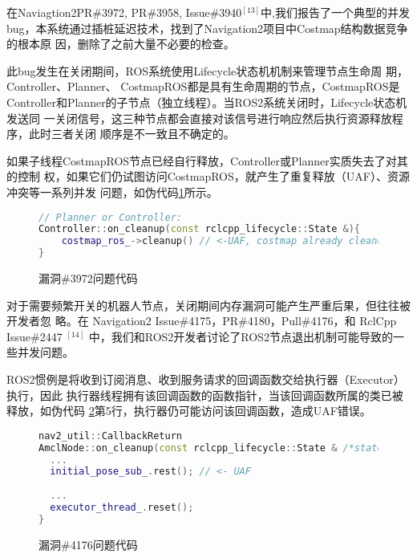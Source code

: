 在Naviagtion2PR\#3972, PR\#3958, Issue\#3940$^{[13]}$中,我们报告了一个典型的并发
bug，本系统通过插桩延迟技术，找到了Navigation2项目中Costmap结构数据竞争的根本原
因，删除了之前大量不必要的检查。

此bug发生在关闭期间，ROS系统使用Lifecycle状态机机制来管理节点生命周
期，Controller、Planner、 CostmapROS都是具有生命周期的节点，CostmapROS是
Controller和Planner的子节点（独立线程）。当ROS2系统关闭时，Lifecycle状态机发送同
一关闭信号，这三种节点都会直接对该信号进行响应然后执行资源释放程序，此时三者关闭
顺序是不一致且不确定的。

如果子线程CostmapROS节点已经自行释放，Controller或Planner实质失去了对其的控制
权，如果它们仍试图访问CostmapROS，就产生了重复释放（UAF）、资源冲突等一系列并发
问题，如伪代码\ref{lst:bug:issue3972}所示。

\begin{figure}[H]
\begin{lstlisting}[language=C++]
// Planner or Controller:
Controller::on_cleanup(const rclcpp_lifecycle::State &){
	costmap_ros_->cleanup() // <-UAF, costmap already cleanup itself.
}
\end{lstlisting}
  \caption{漏洞\#3972问题代码}
  \label{lst:bug:issue3972}
\end{figure}

对于需要频繁开关的机器人节点，关闭期间内存漏洞可能产生严重后果，但往往被开发者忽
略。在 Navigation2 Issue\#4175，PR\#4180，Pull\#4176，和 RclCpp Issue\#2447
$^{[14]}$ 中，我们和ROS2开发者讨论了ROS2节点退出机制可能导致的一些并发问题。

ROS2惯例是将收到订阅消息、收到服务请求的回调函数交给执行器（Executor）执行，因此
执行器线程拥有该回调函数的函数指针，当该回调函数所属的类已被释放，如伪代码
\ref{lst:bug:issue4176}第5行，执行器仍可能访问该回调函数，造成UAF错误。

\begin{figure}[H]
\begin{lstlisting}[language=C++]
nav2_util::CallbackReturn
AmclNode::on_cleanup(const rclcpp_lifecycle::State & /*state*/){
  ...
  initial_pose_sub_.rest(); // <- UAF
  
  ...
  executor_thread_.reset();
}

\end{lstlisting}
  \caption{漏洞\#4176问题代码}
  \label{lst:bug:issue4176}
\end{figure}

